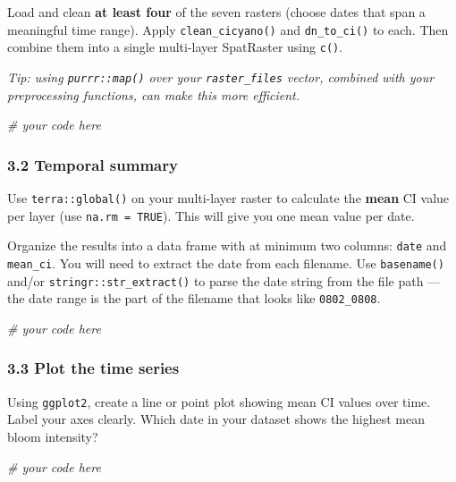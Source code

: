 \documentclass[
]{article}
\newenvironment{Shaded}{\begin{snugshade}}{\end{snugshade}}
\newcommand{\CommentTok}[1]{\textcolor[rgb]{0.56,0.35,0.01}{\textit{#1}}}
\begin{document}
Load and clean \textbf{at least four} of the seven rasters (choose dates
that span a meaningful time range). Apply \texttt{clean\_cicyano()} and
\texttt{dn\_to\_ci()} to each. Then combine them into a single
multi-layer SpatRaster using \texttt{c()}.

\emph{Tip: using \texttt{purrr::map()} over your \texttt{raster\_files}
vector, combined with your preprocessing functions, can make this more
efficient.}

\begin{Shaded}
\begin{Highlighting}[]
\CommentTok{\# your code here}
\end{Highlighting}
\end{Shaded}

\subsubsection{3.2 Temporal summary}\label{temporal-summary}

Use \texttt{terra::global()} on your multi-layer raster to calculate the
\textbf{mean} CI value per layer (use \texttt{na.rm\ =\ TRUE}). This
will give you one mean value per date.

Organize the results into a data frame with at minimum two columns:
\texttt{date} and \texttt{mean\_ci}. You will need to extract the date
from each filename. Use \texttt{basename()} and/or
\texttt{stringr::str\_extract()} to parse the date string from the file
path --- the date range is the part of the filename that looks like
\texttt{0802\_0808}.

\begin{Shaded}
\begin{Highlighting}[]
\CommentTok{\# your code here}
\end{Highlighting}
\end{Shaded}

\subsubsection{3.3 Plot the time series}\label{plot-the-time-series}

Using \texttt{ggplot2}, create a line or point plot showing mean CI
values over time. Label your axes clearly. Which date in your dataset
shows the highest mean bloom intensity?

\begin{Shaded}
\begin{Highlighting}[]
\CommentTok{\# your code here}
\end{Highlighting}
\end{Shaded}
\end{document}
